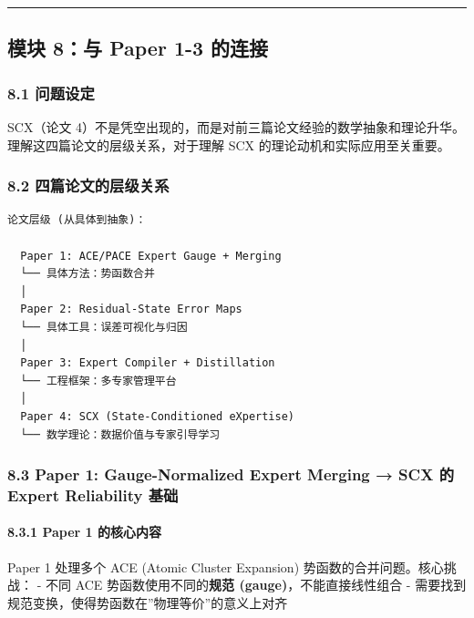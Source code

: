 \documentclass[
  12pt,
]{ctexart}
\begin{document}
\begin{center}\rule{0.5\linewidth}{0.5pt}\end{center}

\subsection{模块 8：与 Paper 1-3
的连接}\label{ux6a21ux5757-8ux4e0e-paper-1-3-ux7684ux8fdeux63a5}

\subsubsection{8.1 问题设定}\label{ux95eeux9898ux8bbeux5b9a-7}

SCX（论文
4）不是凭空出现的，而是对前三篇论文经验的数学抽象和理论升华。理解这四篇论文的层级关系，对于理解
SCX 的理论动机和实际应用至关重要。

\subsubsection{8.2
四篇论文的层级关系}\label{ux56dbux7bc7ux8bbaux6587ux7684ux5c42ux7ea7ux5173ux7cfb}

\begin{verbatim}
论文层级 (从具体到抽象)：

  Paper 1: ACE/PACE Expert Gauge + Merging
  └── 具体方法：势函数合并
  │
  Paper 2: Residual-State Error Maps
  └── 具体工具：误差可视化与归因
  │
  Paper 3: Expert Compiler + Distillation
  └── 工程框架：多专家管理平台
  │
  Paper 4: SCX (State-Conditioned eXpertise)
  └── 数学理论：数据价值与专家引导学习
\end{verbatim}

\subsubsection{8.3 Paper 1: Gauge-Normalized Expert Merging → SCX 的
Expert Reliability
基础}\label{paper-1-gauge-normalized-expert-merging-scx-ux7684-expert-reliability-ux57faux7840}

\paragraph{8.3.1 Paper 1
的核心内容}\label{paper-1-ux7684ux6838ux5fc3ux5185ux5bb9}

Paper 1 处理多个 ACE (Atomic Cluster Expansion)
势函数的合并问题。核心挑战： - 不同 ACE 势函数使用不同的\textbf{规范
(gauge)}，不能直接线性组合 -
需要找到规范变换，使得势函数在''物理等价''的意义上对齐
\end{document}
